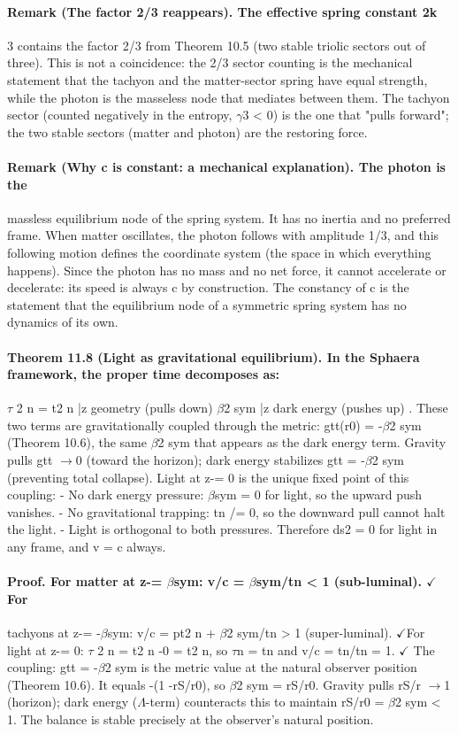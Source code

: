 \documentclass[12pt,a4paper]{article}
\begin{document}
\paragraph*{Remark (The factor 2/3 reappears). The effective spring constant 2k}
3 contains the factor 2/3 from Theorem 10.5 (two stable triolic sectors out of three). This is not a coincidence: the 2/3 sector counting is the mechanical statement that the tachyon and the matter-sector spring have equal strength, while the photon is the masseless node that mediates between them. The tachyon sector (counted negatively in the entropy, $\gamma$3 < 0) is the one that "pulls forward"; the two stable sectors (matter and photon) are the restoring force.
\paragraph*{Remark (Why c is constant: a mechanical explanation). The photon is the}
massless equilibrium node of the spring system. It has no inertia and no preferred frame. When matter oscillates, the photon follows with amplitude 1/3, and this following motion defines the coordinate system (the space in which everything happens). Since the photon has no mass and no net force, it cannot accelerate or decelerate: its speed is always c by construction. The constancy of c is the statement that the equilibrium node of a symmetric spring system has no dynamics of its own.
\paragraph*{Theorem 11.8 (Light as gravitational equilibrium). In the Sphaera framework, the proper time decomposes as:}
$\tau$ 2 n = t2 n |{z} geometry (pulls down) $\beta$2 sym |{z} dark energy (pushes up) . These two terms are gravitationally coupled through the metric: gtt(r0) = -$\beta$2 sym (Theorem 10.6), the same $\beta$2 sym that appears as the dark energy term. Gravity pulls gtt $\to$0 (toward the horizon); dark energy stabilizes gtt = -$\beta$2 sym (preventing total collapse). Light at z-= 0 is the unique fixed point of this coupling:
- No dark energy pressure: $\beta$sym = 0 for light, so the upward push vanishes.
- No gravitational trapping: tn /= 0, so the downward pull cannot halt the
light.
- Light is orthogonal to both pressures.
Therefore ds2 = 0 for light in any frame, and v = c always.
\paragraph*{Proof. For matter at z-= $\beta$sym: v/c = $\beta$sym/tn < 1 (sub-luminal). $\checkmark$For}
tachyons at z-= -$\beta$sym: v/c = pt2 n + $\beta$2 sym/tn > 1 (super-luminal). $\checkmark$For light at z-= 0: $\tau$ 2 n = t2 n -0 = t2 n, so $\tau$n = tn and v/c = tn/tn = 1. $\checkmark$ The coupling: gtt = -$\beta$2 sym is the metric value at the natural observer position (Theorem 10.6). It equals -(1 -rS/r0), so $\beta$2 sym = rS/r0. Gravity pulls rS/r $\to$1 (horizon); dark energy ($\Lambda$-term) counteracts this to maintain rS/r0 = $\beta$2 sym < 1. The balance is stable precisely at the observer's natural position.
\end{document}
